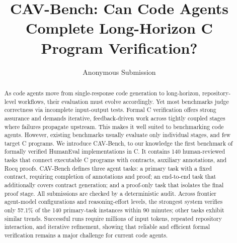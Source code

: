 \documentclass[letterpaper]{article}
\title{CAV-Bench: Can Code Agents Complete Long-Horizon C Program Verification?}
\author{
Anonymous Submission
}
\begin{document}
\maketitle

\begin{abstract}
As code agents move from single-response code generation to long-horizon, repository-level workflows, their evaluation must evolve accordingly. Yet most benchmarks  judge correctness via incomplete input-output tests. Formal C verification offers strong assurance and demands iterative,  feedback-driven work across tightly coupled stages where failures propagate upstream. This makes it well suited to benchmarking code agents.
However, existing benchmarks usually evaluate only individual stages, and few target C programs. We introduce CAV-Bench, to our knowledge the first benchmark of formally verified HumanEval implementations in C. It contains 140 human-reviewed tasks that connect executable C programs with contracts, auxiliary annotations, and Rocq proofs.
CAV-Bench defines three agent tasks: a primary task with a fixed contract, requiring completion of annotations and proof; an end-to-end task that additionally covers contract generation; and a proof-only task that isolates the final proof stage. All submissions are checked by a deterministic audit. Across frontier agent-model configurations and reasoning-effort levels, the strongest system verifies only 57.1\% of the 140 primary-task instances within 90 minutes; other tasks exhibit similar trends. Successful runs require millions of input tokens, repeated repository interaction, and iterative refinement, showing that reliable and efficient formal verification remains a major challenge for current code agents.



\end{abstract}










\end{document}
